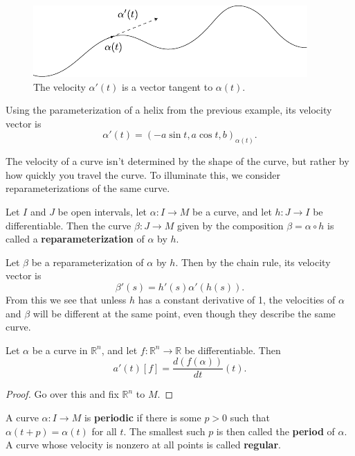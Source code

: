 \documentclass[twoside,10pt]{report}
\begin{document}
\begin{figure}[H]
	\centering
	\includegraphics[scale=1]{fig/velocity.pdf}
	\caption{The velocity $\alpha'(t)$ is a vector tangent to $\alpha(t)$.}
\end{figure}

\begin{ex}
Using the parameterization of a helix from the previous example, its velocity vector is
\[
	\alpha'(t) = (-a \sin t, a \cos t, b)_{\alpha(t)}.
\]
\end{ex}

The velocity of a curve isn't determined by the shape of the curve, but rather by how quickly you travel the curve. To illuminate this, we consider reparameterizations of the same curve.

\begin{defn}
	Let $I$ and $J$ be open intervals, let $\alpha:I\to M$ be a curve, and let $h:J\to I$ be differentiable. Then the curve $\beta:J\to M$ given by the composition $\beta = \alpha \circ h$ is called a \textbf{reparameterization} of $\alpha$ by $h$.
\end{defn}

Let $\beta$ be a reparameterization of $\alpha$ by $h$. Then by the chain rule, its velocity vector is
\[
	\beta'(s) = h'(s) \alpha'(h(s)).
\] 
From this we see that unless $h$ has a constant derivative of 1, the velocities of $\alpha$ and $\beta$ will be different at the same point, even though they describe the same curve.

\begin{prop}
Let $\alpha$ be a curve in $\mathbb{R}^n$, and let $f:\mathbb{R}^n\to \mathbb{R}$ be differentiable. Then
\[
	a'(t)[f] = \frac{d (f(\alpha))}{d t} (t).
\] 
\end{prop}
\begin{proof}
	{\color{red}Go over this and fix $\mathbb{R}^n$ to $M$.}
\end{proof}

A curve $\alpha:I\to M$ is \textbf{periodic} if there is some $p>0$ such that $\alpha(t+p) = \alpha(t)$ for all $t$. The smallest such $p$ is then called the \textbf{period} of $\alpha$. A curve whose velocity is nonzero at all points is called \textbf{regular}.
\end{document}
